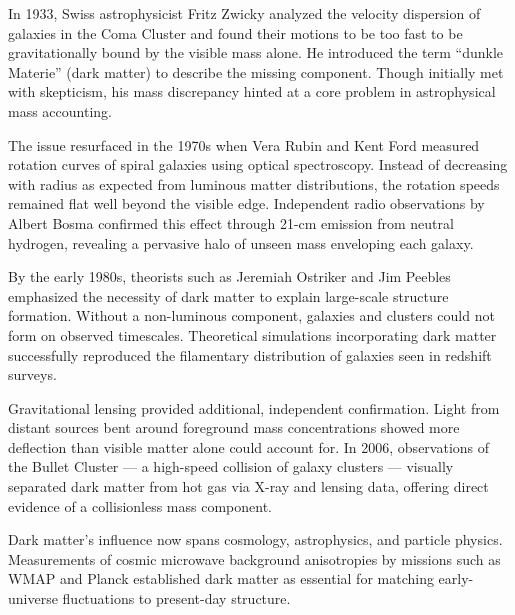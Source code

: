 \begin{historical}
In 1933, Swiss astrophysicist Fritz Zwicky analyzed the velocity dispersion of galaxies in the Coma Cluster and found their motions to be too fast to be gravitationally bound by the visible mass alone. He introduced the term “dunkle Materie” (dark matter) to describe the missing component. Though initially met with skepticism, his mass discrepancy hinted at a core problem in astrophysical mass accounting.

The issue resurfaced in the 1970s when Vera Rubin and Kent Ford measured rotation curves of spiral galaxies using optical spectroscopy. Instead of decreasing with radius as expected from luminous matter distributions, the rotation speeds remained flat well beyond the visible edge. Independent radio observations by Albert Bosma confirmed this effect through 21-cm emission from neutral hydrogen, revealing a pervasive halo of unseen mass enveloping each galaxy.

By the early 1980s, theorists such as Jeremiah Ostriker and Jim Peebles emphasized the necessity of dark matter to explain large-scale structure formation. Without a non-luminous component, galaxies and clusters could not form on observed timescales. Theoretical simulations incorporating dark matter successfully reproduced the filamentary distribution of galaxies seen in redshift surveys.

Gravitational lensing provided additional, independent confirmation. Light from distant sources bent around foreground mass concentrations showed more deflection than visible matter alone could account for. In 2006, observations of the Bullet Cluster — a high-speed collision of galaxy clusters — visually separated dark matter from hot gas via X-ray and lensing data, offering direct evidence of a collisionless mass component.

Dark matter’s influence now spans cosmology, astrophysics, and particle physics. Measurements of cosmic microwave background anisotropies by missions such as WMAP and Planck established dark matter as essential for matching early-universe fluctuations to present-day structure.
\end{historical}
